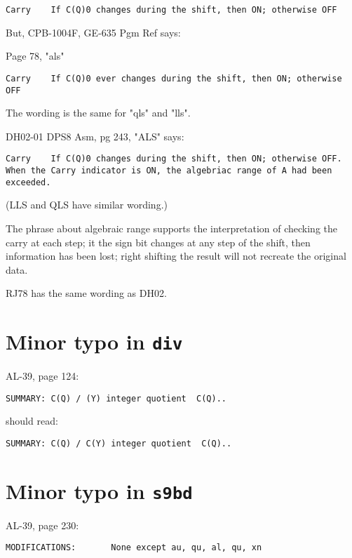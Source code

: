 \documentclass[notitlepage]{report}
\begin{document}
\begin{verbatim}
Carry    If C(Q)0 changes during the shift, then ON; otherwise OFF
\end{verbatim}

But, CPB-1004F, GE-635 Pgm Ref says:

Page 78, "als"

\begin{verbatim}
Carry    If C(Q)0 ever changes during the shift, then ON; otherwise OFF
\end{verbatim}

The wording is the same for "qls" and "lls".

DH02-01 DPS8 Asm, pg 243, "ALS" says:

\begin{verbatim}
Carry    If C(Q)0 changes during the shift, then ON; otherwise OFF. When the Carry indicator is ON, the algebriac range of A had been exceeded.
\end{verbatim}

(LLS and QLS have similar wording.)

The phrase about algebraic range supports the interpretation of checking the carry at each step; it the sign bit changes at any step of the shift, then information has been lost; right shifting the result will not recreate the original data.

RJ78 has the same wording as DH02.

\section{Minor typo in \texttt{div}}

AL-39, page 124:

\begin{verbatim}
SUMMARY: C(Q) / (Y) integer quotient  C(Q)..
\end{verbatim}

should read:

\begin{verbatim}
SUMMARY: C(Q) / C(Y) integer quotient  C(Q)..
\end{verbatim}

\section{Minor typo in \texttt{s9bd}}

AL-39, page 230:

\begin{verbatim}
MODIFICATIONS:       None except au, qu, al, qu, xn
\end{verbatim}
\end{document}
